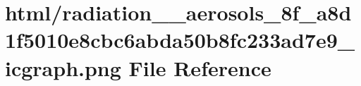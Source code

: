 \hypertarget{radiation____aerosols__8f__a8d1f5010e8cbc6abda50b8fc233ad7e9__icgraph_8png}{}\section{html/radiation\+\_\+\+\_\+aerosols\+\_\+8f\+\_\+a8d1f5010e8cbc6abda50b8fc233ad7e9\+\_\+icgraph.png File Reference}
\label{radiation____aerosols__8f__a8d1f5010e8cbc6abda50b8fc233ad7e9__icgraph_8png}
